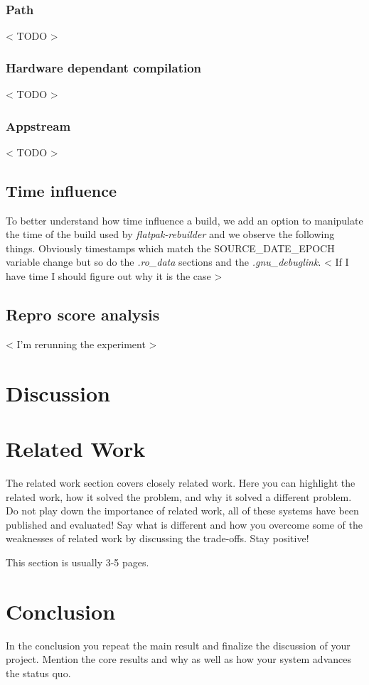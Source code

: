\documentclass[a4paper,11pt,oneside]{report}
\theoremstyle{definition}
\newcommand{\sysname}{\emph{flatpak-rebuilder}\xspace}
\newcommand{\sde}{SOURCE\_DATE\_EPOCH\xspace}
\begin{document}
\subsection{Path}
< TODO >

\subsection{Hardware dependant compilation}
< TODO >

\subsection{Appstream}
< TODO >

\section{Time influence}
To better understand how time influence a build, we add an option to manipulate
the time of the build used by \sysname and we observe the following things.
Obviously timestamps which match the \sde variable change but so do the
\emph{.ro\_data} sections and the \emph{.gnu\_debuglink}.
< If I have time I should figure out why it is the case >

\section{Repro score analysis}
< I'm rerunning the experiment >

\chapter{Discussion}
\label{chap:disc}


\chapter{Related Work}

The related work section covers closely related work. Here you can highlight
the related work, how it solved the problem, and why it solved a different
problem. Do not play down the importance of related work, all of these
systems have been published and evaluated! Say what is different and how
you overcome some of the weaknesses of related work by discussing the
trade-offs. Stay positive!

This section is usually 3-5 pages.


\chapter{Conclusion}

In the conclusion you repeat the main result and finalize the discussion of
your project. Mention the core results and why as well as how your system
advances the status quo.

\cleardoublepage
{}
{}
\printbibliography
\end{document}
